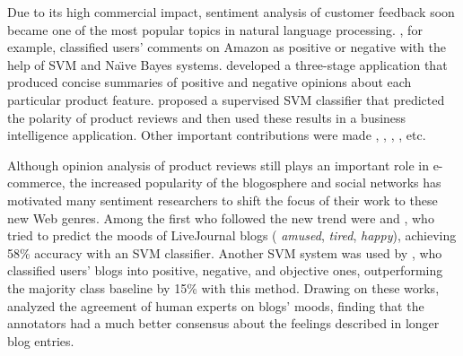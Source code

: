 
Due to its high commercial impact, sentiment analysis of customer
feedback soon became one of the most popular topics in natural
language processing.  \citet{Dave:03}, for example, classified users'
comments on Amazon as positive or negative with the help of SVM and
Na\"{\i}ve Bayes systems.  \citet{Hu:04} developed a three-stage
application that produced concise summaries of positive and negative
opinions about each particular product feature.  \citet{Funk:08}
proposed a supervised SVM classifier that predicted the polarity of
product reviews and then used these results in a business intelligence
application.  Other important contributions were made
\citet{Popescu:05}, \citet{Ding:09}, \citet{Wei:10},
\citet{Mukherjee:12}, etc.


Although opinion analysis of product reviews still plays an important
role in e-commerce, the increased popularity of the blogosphere and
social networks has motivated many sentiment researchers to shift the
focus of their work to these new Web genres.  Among the first who
followed the new trend were \citet{Mishne:05} and \citet{Mishne:07},
who tried to predict the moods of LiveJournal blogs (\eg{}
\emph{amused}, \emph{tired}, \emph{happy}), achieving 58\% accuracy
with an SVM classifier.
Another SVM system was used by \citet{Chesley:06}, who classified
users' blogs into positive, negative, and objective ones,
outperforming the majority class baseline by 15\% with this method.
Drawing on these works, \citet{Gill:08} analyzed the agreement of
human experts on blogs' moods, finding that the annotators had a much
better consensus about the feelings described in longer blog entries.

